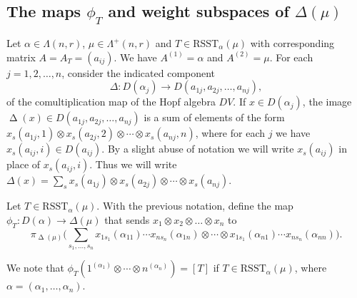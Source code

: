 \documentclass[ALCO,Unicode]{cedram}
\newcommand{\al}{\alpha}
\newcommand{\La}{\Lambda}
\DeclareMathOperator{\D}{\mathrm{\Delta}}
\numberwithin{equation}{section}
\begin{document}
\subsection{The maps \texorpdfstring{$\phi_T$}{phi\_T} and weight subspaces of \texorpdfstring{$\Delta(\mu)$}{Delta(mu)}}\label{s2.3} Let $\al \in \La(n,r)$, $\mu \in \La^{+}(n,r)$ and $T \in  \mathrm{RSST}_{\al}(\mu)$ with corresponding matrix $A=A_T=(a_{ij})$. We have $A^{(1)}=\al $ and $A^{(2)}=\mu$. For each $j=1,2,\dots,n$, consider the indicated component \begin{equation}\label{D} \Delta: D(\al_j) \to D(a_{1j},a_{2j},\dots,a_{nj}),\end{equation} of the comultiplication map of the Hopf algebra $DV$. If $x \in D(\al_j)$, the image $\D(x) \in D(a_{1j},a_{2j},\dots,a_{nj})$ is a sum of elements of the form $x_s(a_{1j},1) \otimes x_s(a_{2j},2) \otimes \cdots \otimes x_s(a_{nj},n)$, where for each $j$ we have $x_s(a_{ij},i) \in D(a_{ij})$. By a slight abuse of notation we will write $x_s(a_{ij})$ in place of $x_s(a_{ij},i)$. Thus we will write $\Delta(x) = \sum_{s}x_s(a_{1j}) \otimes x_s(a_{2j}) \otimes \cdots \otimes x_s(a_{nj})$.
\begin{defi}\label{def2.4}
	Let $T \in \mathrm{RSST}_{\al}(\mu)$. With the previous notation, define the map $ \phi_{T}:D(\al) \to \Delta(\mu)$ that sends  $x_1 \otimes x_2 \otimes \dots\otimes x_n$ to \[\pi_{\D(\mu)} \big( \sum_{s_1,\dots,s_n}x_{1s_1}(\al_{11}) \cdots x_{ns_n}(\al_{1n}) \otimes  \cdots \otimes x_{1s_1}(\al_{n1})\cdots x_{ns_n}(\al_{nn}) \big). \]
\end{defi}
\begin{rema}\label{remarkphi}
	We note that $\phi_T(1^{(\al_1)} \otimes \cdots \otimes n^{(\al_n)} )=[T]$ if $T \in \mathrm{RSST}_{\al}(\mu)$, where $\al = (\al_1,\dots,\al_n).$
\end{rema}
\end{document}
